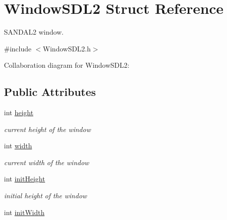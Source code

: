 \hypertarget{structWindowSDL2}{}\section{Window\+S\+D\+L2 Struct Reference}
\label{structWindowSDL2}


S\+A\+N\+D\+A\+L2 window.  




{\ttfamily \#include $<$Window\+S\+D\+L2.\+h$>$}



Collaboration diagram for Window\+S\+D\+L2\+:
\subsection*{Public Attributes}
\begin{DoxyCompactItemize}
\item 
int \hyperlink{structWindowSDL2_a6a3ca624143f2bf9852cb623d302c56d}{height}\hypertarget{structWindowSDL2_a6a3ca624143f2bf9852cb623d302c56d}{}\label{structWindowSDL2_a6a3ca624143f2bf9852cb623d302c56d}

\begin{DoxyCompactList}\small\item\em current height of the window \end{DoxyCompactList}\item 
int \hyperlink{structWindowSDL2_ade5a776a9e5a2812542ee9b539d66960}{width}\hypertarget{structWindowSDL2_ade5a776a9e5a2812542ee9b539d66960}{}\label{structWindowSDL2_ade5a776a9e5a2812542ee9b539d66960}

\begin{DoxyCompactList}\small\item\em current width of the window \end{DoxyCompactList}\item 
int \hyperlink{structWindowSDL2_ad18f000e45db56098bd8c2ea87e75019}{init\+Height}\hypertarget{structWindowSDL2_ad18f000e45db56098bd8c2ea87e75019}{}\label{structWindowSDL2_ad18f000e45db56098bd8c2ea87e75019}

\begin{DoxyCompactList}\small\item\em initial height of the window \end{DoxyCompactList}\item 
int \hyperlink{structWindowSDL2_ab6f213858040a055c371f947c4a71fca}{init\+Width}\hypertarget{structWindowSDL2_ab6f213858040a055c371f947c4a71fca}{}\label{structWindowSDL2_ab6f213858040a055c371f947c4a71fca}


\end{DoxyCompactItemize}
